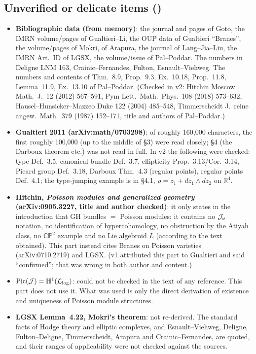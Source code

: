 \subsection{Unverified or delicate items (\tQ)}
\begin{itemize}
\item \textbf{Bibliographic data (from memory)}: the journal and pages of Goto, the IMRN volume/pages of Gualtieri--Li, the OUP data of Gualtieri ``Branes'', the volume/pages of Mokri, of Arapura, the journal of Lang--Jia--Liu, the IMRN Art.\ ID of LGSX, the volume/issue of Pal--Poddar. The numbers in Deligne LNM 163, Crainic--Fernandes, Fulton, Esnault--Viehweg. The numbers and contents of Thm.~8.9, Prop.~9.3, Ex.~10.18, Prop.~11.8, Lemma~11.9, Ex.~13.10 of Pal--Poddar. (Checked in v2: Hitchin Moscow Math.\ J.\ 12 (2012) 567--591, Pym Lett.\ Math.\ Phys.\ 108 (2018) 573--632, Hausel--Hunsicker--Mazzeo Duke 122 (2004) 485--548, Timmerscheidt J.\ reine angew.\ Math.\ 379 (1987) 152--171, title and authors of Pal--Poddar.)
\item \textbf{Gualtieri 2011 (arXiv:math/0703298)}: of roughly 160,000 characters, the first roughly 100,000 (up to the middle of \S3) were read closely; \S4 (the Darboux theorem etc.) was not read in full. In v2 the following were checked: type Def.~3.5, canonical bundle Def.~3.7, ellipticity Prop.~3.13/Cor.~3.14, Picard group Def.~3.18, Darboux Thm.~4.3 (regular points), regular points Def.~4.1; the type-jumping example is in \S4.1, $\rho=z_1+dz_1\wedge dz_2$ on $\mathbb R^4$.
\item \textbf{Hitchin, \emph{Poisson modules and generalized geometry} (arXiv:0905.3227, title and author checked)}: it only states in the introduction that GH bundles $=$ Poisson modules; it contains no $\mathcal J_\sigma$ notation, no identification of hypercohomology, no obstruction by the Atiyah class, no $\mathbb{CP}^2$ example and no Lie algebroid $L$ (according to the text obtained). This part instead cites Branes on Poisson varieties (arXiv:0710.2719) and LGSX. (v1 attributed this part to Gualtieri and said ``confirmed''; that was wrong in both author and content.)
\item \textbf{$\mathrm{Pic}(\mathcal J)=\mathbb H^1(\mathcal L_{\log})$}: could not be checked in the text of any reference. This part does not use it. What was used is only the direct derivation of existence and uniqueness of Poisson module structures.
\item \textbf{LGSX Lemma~4.22, Mokri's theorem}: not re-derived. The standard facts of Hodge theory and elliptic complexes, and Esnault--Viehweg, Deligne, Fulton--Deligne, Timmerscheidt, Arapura and Crainic--Fernandes, are quoted, and their ranges of applicability were not checked against the sources.

\end{itemize}
